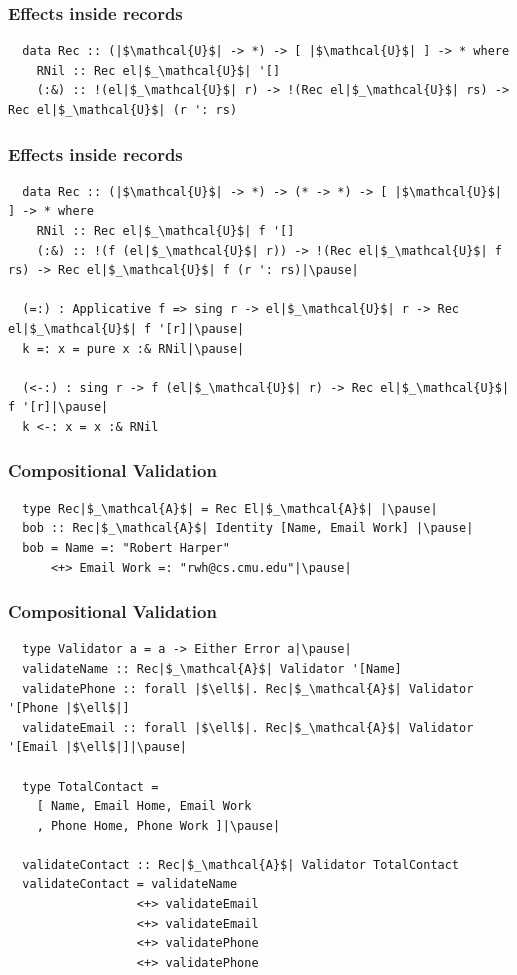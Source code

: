 \documentclass[12pt]{beamer}
\begin{document}
\begin{frame}[fragile]
  \frametitle{Effects inside records}
  \begin{lstlisting}
  data Rec :: (|$\mathcal{U}$| -> *) -> [ |$\mathcal{U}$| ] -> * where
    RNil :: Rec el|$_\mathcal{U}$| '[]
    (:&) :: !(el|$_\mathcal{U}$| r) -> !(Rec el|$_\mathcal{U}$| rs) -> Rec el|$_\mathcal{U}$| (r ': rs)
  \end{lstlisting}
\end{frame}
\begin{frame}[fragile]
  \frametitle{Effects inside records}
  \begin{lstlisting}
  data Rec :: (|$\mathcal{U}$| -> *) -> (* -> *) -> [ |$\mathcal{U}$| ] -> * where
    RNil :: Rec el|$_\mathcal{U}$| f '[]
    (:&) :: !(f (el|$_\mathcal{U}$| r)) -> !(Rec el|$_\mathcal{U}$| f rs) -> Rec el|$_\mathcal{U}$| f (r ': rs)|\pause|

  (=:) : Applicative f => sing r -> el|$_\mathcal{U}$| r -> Rec el|$_\mathcal{U}$| f '[r]|\pause|
  k =: x = pure x :& RNil|\pause|

  (<-:) : sing r -> f (el|$_\mathcal{U}$| r) -> Rec el|$_\mathcal{U}$| f '[r]|\pause|
  k <-: x = x :& RNil
  \end{lstlisting}
\end{frame}

\begin{frame}[fragile]
  \frametitle{Compositional Validation}

  \begin{lstlisting}
  type Rec|$_\mathcal{A}$| = Rec El|$_\mathcal{A}$| |\pause|
  bob :: Rec|$_\mathcal{A}$| Identity [Name, Email Work] |\pause|
  bob = Name =: "Robert Harper"
      <+> Email Work =: "rwh@cs.cmu.edu"|\pause|
  \end{lstlisting}
\end{frame}

\begin{frame}[fragile]
  \frametitle{Compositional Validation}
  \begin{lstlisting}
  type Validator a = a -> Either Error a|\pause|
  validateName :: Rec|$_\mathcal{A}$| Validator '[Name]
  validatePhone :: forall |$\ell$|. Rec|$_\mathcal{A}$| Validator '[Phone |$\ell$|]
  validateEmail :: forall |$\ell$|. Rec|$_\mathcal{A}$| Validator '[Email |$\ell$|]|\pause|

  type TotalContact =
    [ Name, Email Home, Email Work
    , Phone Home, Phone Work ]|\pause|

  validateContact :: Rec|$_\mathcal{A}$| Validator TotalContact
  validateContact = validateName
                  <+> validateEmail
                  <+> validateEmail
                  <+> validatePhone
                  <+> validatePhone
  \end{lstlisting}
\end{frame}
\end{document}
